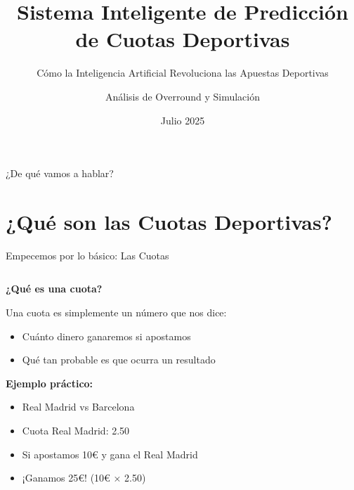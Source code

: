 \documentclass[aspectratio=169]{beamer}
\title{Sistema Inteligente de Predicción de Cuotas Deportivas}
\subtitle{Cómo la Inteligencia Artificial Revoluciona las Apuestas Deportivas}
\author{Análisis de Overround y Simulación}
\date{Julio 2025}
\begin{document}
\begin{frame}
\titlepage
\end{frame}

\begin{frame}{¿De qué vamos a hablar?}
\tableofcontents
\end{frame}

\section{¿Qué son las Cuotas Deportivas?}

\begin{frame}{Empecemos por lo básico: Las Cuotas}
\begin{columns}
\begin{column}{0.6\textwidth}
\large
\textbf{¿Qué es una cuota?}

Una cuota es simplemente un número que nos dice:
\begin{itemize}
\item \textcolor{azulprincipai}{Cuánto dinero ganaremos} si apostamos
\item \textcolor{rojocomplementario}{Qué tan probable} es que ocurra un resultado
\end{itemize}

\vspace{0.5cm}
\textbf{Ejemplo práctico:}
\begin{itemize}
\item Real Madrid vs Barcelona
\item Cuota Real Madrid: 2.50
\item Si apostamos 10€ y gana el Real Madrid
\item ¡Ganamos 25€! (10€ × 2.50)
\end{itemize}
\end{column}
\begin{column}{0.4\textwidth}
\end{column}
\end{columns}
\end{frame}
\end{document}
